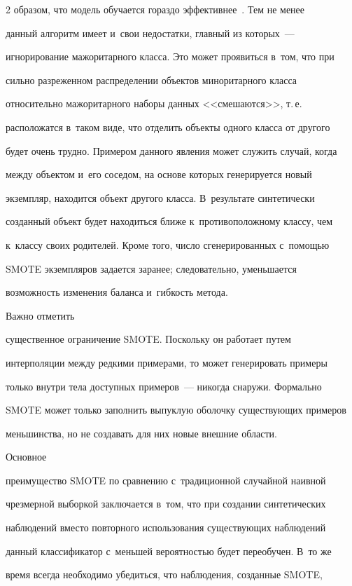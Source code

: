 \begin{multicols}{2}
образом, что модель обучается гораздо эффективнее~\cite{9-sev}. Тем не менее 

данный алгоритм имеет и~свои недостатки, главный из которых~--- 

игнорирование мажоритарного класса. Это может проявиться в~том, что при 

сильно разреженном распределении объектов миноритарного класса 

относительно мажоритарного наборы данных <<смешаются>>, т.\,е.\ 

расположатся в~таком виде, что отделить объекты одного класса от другого 

будет очень трудно. Примером данного явления может служить случай, когда

между объектом и~его соседом, на основе которых генерируется новый 

экземпляр, находится объект другого класса. В~результате синтетически 

созданный объект будет находиться ближе к~противоположному классу, чем 

к~классу своих родителей. Кроме того, число сгенерированных с~помощью 

SMOTE экземпляров задается заранее; следовательно, уменьшается 

возможность изменения баланса и~гибкость метода. 



Важно отметить 

существенное ограничение SMOTE. Поскольку он работает путем 

интерполяции между редкими примерами, то может генерировать примеры 

только внутри тела доступных примеров~--- никогда снаружи. Формально 

SMOTE может только заполнить выпуклую оболочку существующих примеров 

меньшинства, но не создавать для них новые внешние области. 



Основное 

преимущество SMOTE по сравнению с~традиционной случайной наивной 

чрезмерной выборкой заключается в~том, что при создании синтетических 

наблюдений вместо повторного использования существующих наблюдений 

данный классификатор с~меньшей вероятностью будет переобучен. В~то же 

время всегда необходимо убедиться, что наблюдения, созданные SMOTE, 


\end{multicols}
